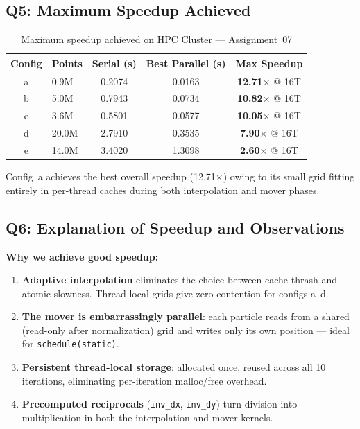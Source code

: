 \documentclass[12pt,a4paper]{article}
\begin{document}
\subsection{Q5: Maximum Speedup Achieved}

\begin{table}[H]
\centering
\caption{Maximum speedup achieved on HPC Cluster --- Assignment~07}
\label{tab:a7_max_speedup}
\begin{tabular}{clccc}
\toprule
\textbf{Config} & \textbf{Points} & \textbf{Serial (s)} & \textbf{Best Parallel (s)} & \textbf{Max Speedup} \\
\midrule
a & 0.9M  & 0.2074 & 0.0163 & \textbf{12.71$\times$} @ 16T \\
b & 5.0M  & 0.7943 & 0.0734 & \textbf{10.82$\times$} @ 16T \\
c & 3.6M  & 0.5801 & 0.0577 & \textbf{10.05$\times$} @ 16T \\
d & 20.0M & 2.7910 & 0.3535 & \textbf{7.90$\times$}  @ 16T \\
e & 14.0M & 3.4020 & 1.3098 & \textbf{2.60$\times$}  @ 16T \\
\bottomrule
\end{tabular}
\end{table}

Config~a achieves the best overall speedup (12.71$\times$) owing to its small grid fitting
entirely in per-thread caches during both interpolation and mover phases.

\subsection{Q6: Explanation of Speedup and Observations}

\textbf{Why we achieve good speedup:}
\begin{enumerate}
    \item \textbf{Adaptive interpolation} eliminates the choice between cache thrash and atomic
          slowness. Thread-local grids give zero contention for configs a--d.
    \item \textbf{The mover is embarrassingly parallel}: each particle reads from a shared
          (read-only after normalization) grid and writes only its own position --- ideal
          for \texttt{schedule(static)}.
    \item \textbf{Persistent thread-local storage}: allocated once, reused across all 10
          iterations, eliminating per-iteration malloc/free overhead.
    \item \textbf{Precomputed reciprocals} (\texttt{inv\_dx}, \texttt{inv\_dy}) turn
          division into multiplication in both the interpolation and mover kernels.
\end{enumerate}
\end{document}
